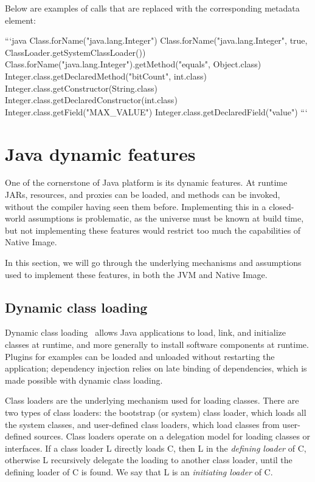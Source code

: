 Below are examples of calls that are replaced with the corresponding metadata element:

```java
Class.forName("java.lang.Integer")
Class.forName("java.lang.Integer", true, ClassLoader.getSystemClassLoader())
Class.forName("java.lang.Integer").getMethod("equals", Object.class)
Integer.class.getDeclaredMethod("bitCount", int.class)
Integer.class.getConstructor(String.class)
Integer.class.getDeclaredConstructor(int.class)
Integer.class.getField("MAX\_VALUE")
Integer.class.getDeclaredField("value")
```

\section{Java dynamic features}
One of the cornerstone of Java platform is its dynamic features. At runtime JARs, resources, and proxies can be loaded, and methods can be invoked, without the compiler having seen them before. 
Implementing this in a closed-world assumptions is problematic, as the universe must be known at build time, but not implementing these features would restrict too much the capabilities of Native Image.

In this section, we will go through the underlying mechanisms and assumptions used to implement these features, in both the JVM and Native Image.

\subsection{Dynamic class loading}
Dynamic class loading~\cite{liang_dynamic_nodate} allows Java applications to load, link, and initialize classes at runtime, and more generally to install software components at runtime. Plugins for examples can be loaded and unloaded without restarting the application; dependency injection relies on late binding of dependencies, which is made possible with dynamic class loading. 

Class loaders are the underlying mechanism used for loading classes. 
There are two types of class loaders: the bootstrap (or system) class loader, which loads all the system classes, and user-defined class loaders, which load classes from user-defined sources.
Class loaders operate on a delegation model for loading classes or interfaces. If a class loader L directly loads C, then L in the \textit{defining loader} of C, otherwise L recursively delegate the loading to another class loader, until the defining loader of C is found. We say that L is an \textit{initiating loader} of C. 

